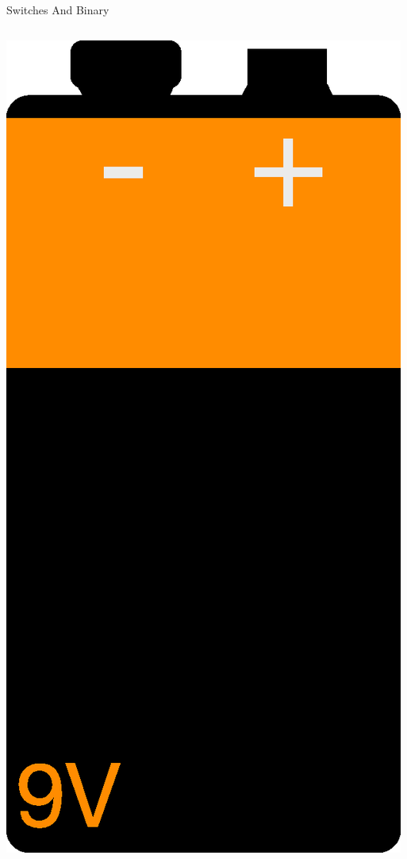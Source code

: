 \documentclass{beamer}
\begin{document}
\begin{frame}{Switches And Binary}
\begin{columns}
    \includegraphics[scale=0.25]{../assets/9V-Battery.eps}
    
  \end{columns}
\end{frame}
\end{document}
